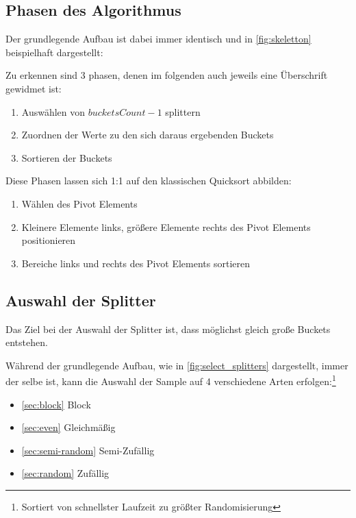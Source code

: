 	\subsection{Phasen des Algorithmus}
		Der grundlegende Aufbau ist dabei immer identisch und in \ref{fig:skeletton} beispielhaft dargestellt:
		
		Zu erkennen sind 3 phasen, denen im folgenden auch jeweils eine Überschrift gewidmet ist:
		\begin{enumerate}
			\item Auswählen von $\textit{bucketsCount}-1$ splittern
			\item Zuordnen der Werte zu den sich daraus ergebenden Buckets
			\item Sortieren der Buckets
		\end{enumerate}
		Diese Phasen lassen sich 1:1 auf den klassischen Quicksort abbilden:
		\begin{enumerate}
			\item Wählen des Pivot Elements
			\item Kleinere Elemente links, größere Elemente rechts des Pivot Elements positionieren
			\item Bereiche links und rechts des Pivot Elements sortieren
		\end{enumerate}
		

	\subsection{Auswahl der Splitter}
		Das Ziel bei der Auswahl der Splitter ist, dass möglichst gleich große Buckets entstehen.
		
		Während der grundlegende Aufbau, wie in \ref{fig:select_splitters} dargestellt, immer der selbe ist, kann die Auswahl der Sample auf 4 verschiedene Arten erfolgen:\footnote{Sortiert von schnellster Laufzeit zu größter Randomisierung} \autocite{berlin-2007}
		\begin{itemize}
			\item \ref{sec:block} Block
			\item \ref{sec:even} Gleichmäßig
			\item \ref{sec:semi-random} Semi-Zufällig
			\item \ref{sec:random} Zufällig
		\end{itemize}
		
